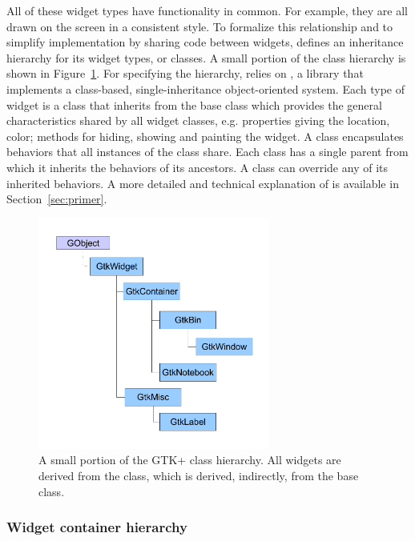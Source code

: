 \documentclass[article,shortnames]{jss}
\begin{document}
All of these widget types have functionality in common. For example,
they are all drawn on the screen in a consistent style. To formalize
this relationship and to simplify implementation by sharing code
between widgets,  defines an inheritance hierarchy for its
widget types, or classes. A small portion of the  class
hierarchy is shown in Figure~\ref{fig:class-hierarchy}. For specifying
the hierarchy,  relies on , a 
library that implements a class-based, single-inheritance
object-oriented system.  Each type of  widget is a
 class that inherits from the base  class
which provides the general characteristics shared by all widget
classes, e.g. properties giving the location, color; methods for
hiding, showing and painting the widget. A  class
encapsulates behaviors that all instances of the class share.  Each
class has a single parent from which it inherits the behaviors of its
ancestors. A class can override any of its inherited behaviors.  A
more detailed and technical explanation of  is available
in Section~\ref{sec:primer}.

\begin{figure}[h!tbp]
\begin{center}
\includegraphics[width=3in]{class-hierarchy.pdf}
\caption{\label{fig:class-hierarchy}A small portion of the GTK+ class
hierarchy. 
All widgets are derived from the  class, which is
derived, 
indirectly, from the  base class.}
\end{center}
\end{figure}

\subsubsection{Widget container hierarchy}
\end{document}
